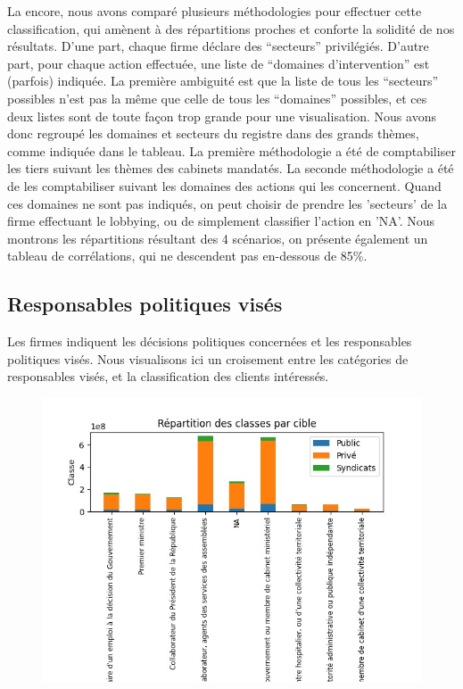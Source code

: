 \documentclass[a4paper,12pt]{article}
\begin{document}
La encore, nous avons comparé plusieurs méthodologies pour effectuer cette classification, qui amènent à des répartitions proches et conforte la solidité de nos résultats. D'une part, chaque firme déclare des ``secteurs'' privilégiés. D'autre part, pour chaque action effectuée, une liste de ``domaines d'intervention'' est (parfois) indiquée. La première ambiguité est que la liste de tous les ``secteurs'' possibles n'est pas la m\^eme que celle de tous les ``domaines'' possibles, et ces deux listes sont de toute fa\c con trop grande pour une visualisation. Nous avons donc regroupé les domaines et secteurs du registre dans des grands thèmes, comme indiquée dans le tableau. La première méthodologie a été de comptabiliser les tiers suivant les thèmes des cabinets mandatés. La seconde méthodologie a été de les comptabiliser suivant les domaines des actions qui les concernent. Quand ces domaines ne sont pas indiqués, on peut choisir de prendre les 'secteurs' de la firme effectuant le lobbying, ou de simplement classifier l'action en 'NA'. Nous montrons les répartitions résultant des 4 scénarios, on présente également un tableau de corrélations, qui ne descendent pas en-dessous de 85\%.

\subsection{Responsables politiques visés}

Les firmes indiquent les décisions politiques concernées et les responsables politiques visés. Nous visualisons ici un croisement entre les catégories de responsables visés, et la classification des clients intéressés.


\begin{figure}[h!]
\begin{center}
\includegraphics[scale=.5]{croise_cibles_classif}
\label{fig}\caption{}\
\end{center}
\end{figure}
\end{document}
